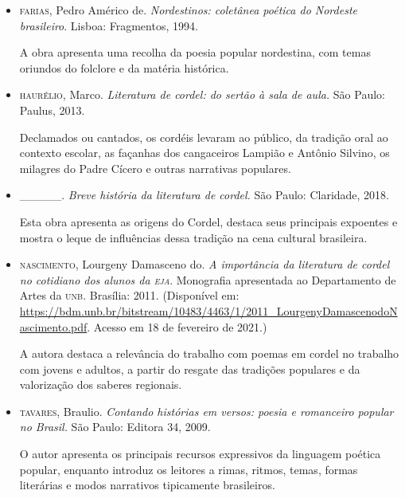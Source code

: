 \documentclass[12pt]{extarticle}
\begin{document}
\begin{itemize}
\item\textsc{farias}, Pedro Américo de. \textit{Nordestinos: coletânea poética do
  Nordeste brasileiro}. Lisboa: Fragmentos, 1994.

A obra apresenta uma recolha da poesia popular nordestina, com temas
oriundos do folclore e da matéria histórica.

\item\textsc{haurélio}, Marco. \textit{Literatura de cordel: do sertão à sala de
  aula.} São Paulo: Paulus, 2013.

Declamados ou cantados, os cordéis levaram ao público, da tradição oral
ao contexto escolar, as façanhas dos cangaceiros Lampião e Antônio
Silvino, os milagres do Padre Cícero e outras narrativas populares.

\item\_\_\_\_\_. \textit{Breve história da literatura de cordel.} São
  Paulo: Claridade, 2018.

Esta obra apresenta as origens do Cordel, destaca seus principais
expoentes e mostra o leque de influências dessa tradição na cena
cultural brasileira.

\item\textsc{nascimento}, Lourgeny Damasceno do. \textit{A importância da literatura
  de cordel no cotidiano dos alunos da \textsc{eja}}. Monografia apresentada ao
  Departamento de Artes da \textsc{unb}. Brasília: 2011. (Disponível em:
  \url{https://bdm.unb.br/bitstream/10483/4463/1/2011_LourgenyDamascenodoNascimento.pdf}.
  Acesso em 18 de fevereiro de 2021.)

A autora destaca a relevância do trabalho com poemas em cordel no
trabalho com jovens e adultos, a partir do resgate das tradições
populares e da valorização dos saberes regionais.

\item\textsc{tavares}, Braulio. \textit{Contando histórias em versos: poesia e
  romanceiro popular no Brasil.} São Paulo: Editora 34, 2009.

O autor apresenta os principais recursos expressivos da linguagem
poética popular, enquanto introduz os leitores a rimas, ritmos, temas,
formas literárias e modos narrativos tipicamente brasileiros.
\end{itemize}
\end{document}
